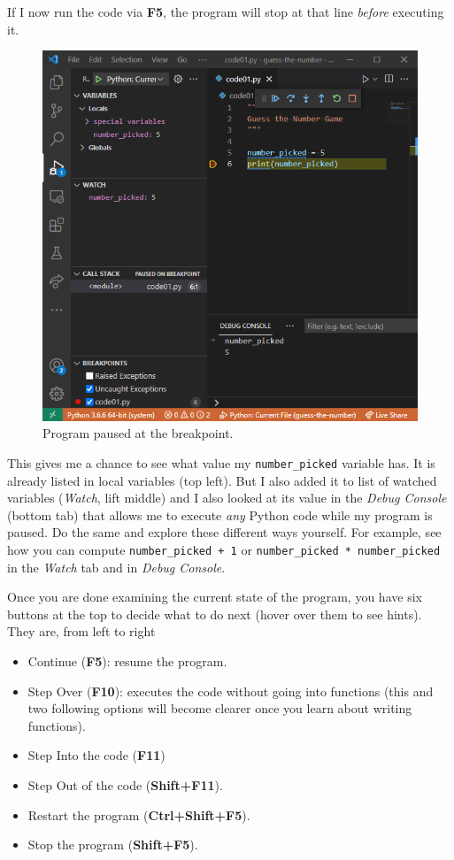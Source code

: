 \documentclass[
]{book}
\providecommand{\tightlist}{%
  \setlength{\itemsep}{0pt}\setlength{\parskip}{0pt}}
\begin{document}
If I now run the code via \textbf{F5}, the program will stop at that line \emph{before} executing it.

\begin{figure}
\centering
\includegraphics{images/debug-pause.png}
\caption{Program paused at the breakpoint.}
\end{figure}

This gives me a chance to see what value my \texttt{number\_picked} variable has. It is already listed in local variables (top left). But I also added it to list of watched variables (\emph{Watch}, lift middle) and I also looked at its value in the \emph{Debug Console} (bottom tab) that allows me to execute \emph{any} Python code while my program is paused. Do the same and explore these different ways yourself. For example, see how you can compute \texttt{number\_picked\ +\ 1} or \texttt{number\_picked\ *\ number\_picked} in the \emph{Watch} tab and in \emph{Debug Console}.

Once you are done examining the current state of the program, you have six buttons at the top to decide what to do next (hover over them to see hints). They are, from left to right

\begin{itemize}
\tightlist
\item
  Continue (\textbf{F5}): resume the program.
\item
  Step Over (\textbf{F10}): executes the code without going into functions (this and two following options will become clearer once you learn about writing functions).
\item
  Step Into the code (\textbf{F11})
\item
  Step Out of the code (\textbf{Shift+F11}).
\item
  Restart the program (\textbf{Ctrl+Shift+F5}).
\item
  Stop the program (\textbf{Shift+F5}).
\end{itemize}
\end{document}
